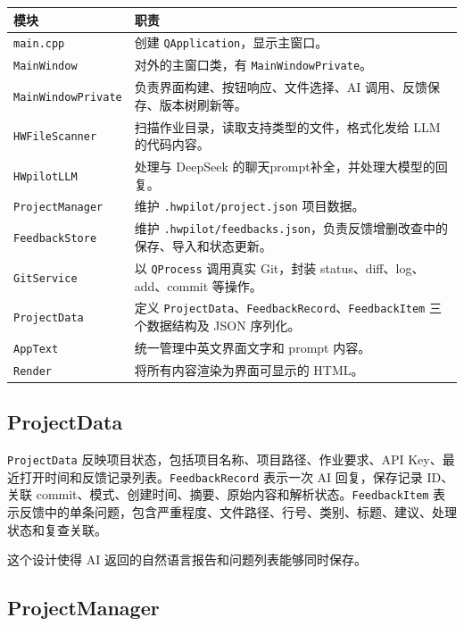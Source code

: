 \documentclass[UTF8,a4paper,11pt,fontset=fandol]{ctexart}
\begin{document}
\begin{center}
\begin{tabular}{p{4.2cm}p{9.2cm}}
\toprule
模块 & 职责 \\
\midrule
\texttt{main.cpp} & 创建 \texttt{QApplication}，显示主窗口。 \\
\texttt{MainWindow} & 对外的主窗口类，有 \texttt{MainWindowPrivate}。 \\
\texttt{MainWindowPrivate} & 负责界面构建、按钮响应、文件选择、AI 调用、反馈保存、版本树刷新等。 \\
\texttt{HWFileScanner} & 扫描作业目录，读取支持类型的文件，格式化发给 LLM 的代码内容。 \\
\texttt{HWpilotLLM} & 处理与 DeepSeek 的聊天prompt补全，并处理大模型的回复。 \\
\texttt{ProjectManager} & 维护 \texttt{.hwpilot/project.json} 项目数据。 \\
\texttt{FeedbackStore} & 维护 \texttt{.hwpilot/feedbacks.json}，负责反馈增删改查中的保存、导入和状态更新。 \\
\texttt{GitService} & 以 \texttt{QProcess} 调用真实 Git，封装 status、diff、log、add、commit 等操作。 \\
\texttt{ProjectData} & 定义 \texttt{ProjectData}、\texttt{FeedbackRecord}、\texttt{FeedbackItem} 三个数据结构及 JSON 序列化。 \\
\texttt{AppText} & 统一管理中英文界面文字和 prompt 内容。 \\
\texttt{Render} & 将所有内容渲染为界面可显示的 HTML。 \\
\bottomrule
\end{tabular}
\end{center}

\subsection{ProjectData}

\texttt{ProjectData} 反映项目状态，包括项目名称、项目路径、作业要求、API Key、最近打开时间和反馈记录列表。\texttt{FeedbackRecord} 表示一次 AI 回复，保存记录 ID、关联 commit、模式、创建时间、摘要、原始内容和解析状态。\texttt{FeedbackItem} 表示反馈中的单条问题，包含严重程度、文件路径、行号、类别、标题、建议、处理状态和复查关联。

这个设计使得 AI 返回的自然语言报告和问题列表能够同时保存。

\subsection{ProjectManager}
\end{document}
